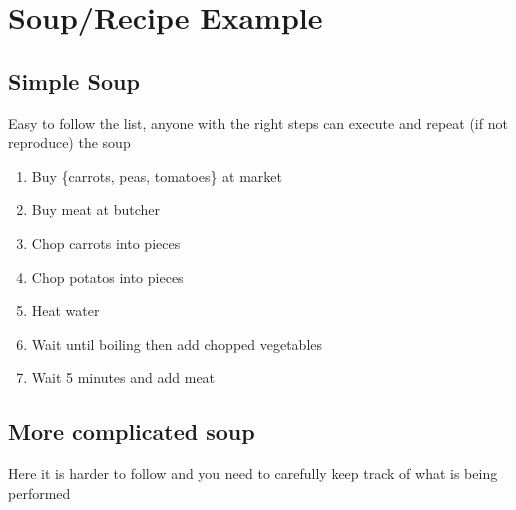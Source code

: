 \documentclass[letterpaper,10pt,english]{sphinxmanual}
\begin{document}
\chapter{Soup/Recipe Example}
\label{\detokenize{01-Introduction:soup-recipe-example}}

\section{Simple Soup}
\label{\detokenize{01-Introduction:simple-soup}}
\sphinxAtStartPar
Easy to follow the list, anyone with the right steps can execute and repeat (if not reproduce) the soup
\begin{enumerate}
%
\item {} 
\sphinxAtStartPar
Buy \{carrots, peas, tomatoes\} at market

\item {} 
\sphinxAtStartPar
{} Buy meat at butcher

\item {} 
\sphinxAtStartPar
{} Chop carrots into pieces

\item {} 
\sphinxAtStartPar
{} Chop potatos into pieces

\item {} 
\sphinxAtStartPar
{} Heat water

\item {} 
\sphinxAtStartPar
{} Wait until boiling then add chopped vegetables

\item {} 
\sphinxAtStartPar
{} Wait 5 minutes and add meat

\end{enumerate}


\section{More complicated soup}
\label{\detokenize{01-Introduction:more-complicated-soup}}
\sphinxAtStartPar
Here it is harder to follow and you need to carefully keep track of what is being performed
\end{document}
